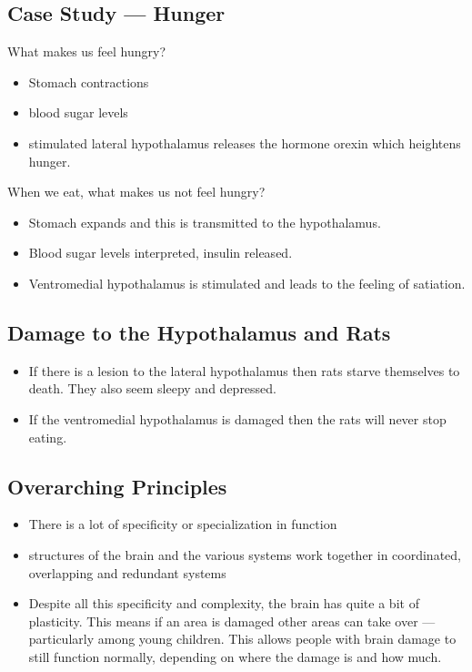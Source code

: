\documentclass[12pt]{article}
\begin{document}
\subsection{Case Study --- Hunger}

What makes us feel hungry?
\begin{itemize}
    \item Stomach contractions
    \item blood sugar levels
    \item stimulated lateral hypothalamus releases the hormone orexin which
        heightens hunger.
\end{itemize}

When we eat, what makes us not feel hungry?
\begin{itemize}
    \item Stomach expands and this is transmitted to the hypothalamus.
    \item Blood sugar levels interpreted, insulin released.
    \item Ventromedial hypothalamus is stimulated and leads to the feeling of
        satiation.
\end{itemize}

\subsection{Damage to the Hypothalamus and Rats}

\begin{itemize}
    \item If there is a lesion to the lateral hypothalamus then rats starve
        themselves to death. They also seem sleepy and depressed.
    \item If the ventromedial hypothalamus is damaged then the rats will never
        stop eating.
\end{itemize}

\subsection{Overarching Principles}

\begin{itemize}
    \item There is a lot of specificity or specialization in function
    \item structures of the brain and the various systems work together in
        coordinated, overlapping and redundant systems
    \item Despite all this specificity and complexity, the brain has quite a bit
        of plasticity. This means if an area is damaged other areas can take
        over --- particularly among young children. This allows people with
        brain damage to still function normally, depending on where the damage
        is and how much.
\end{itemize}
\end{document}

